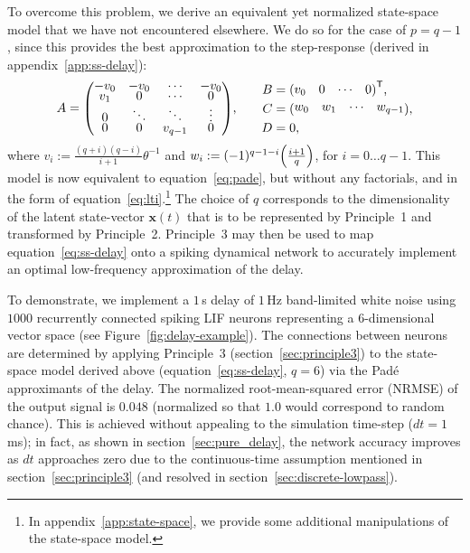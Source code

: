 \documentclass[12pt]{article}
\theoremstyle{definition}
\renewcommand{\vec}{\mathbf}  %
\newcommand{\transpose}[1]{{#1}^\mathsf{T}}
\let\originalleft\left
\let\originalright\right
\renewcommand{\left}{\mathopen{}\mathclose\bgroup\originalleft}
\renewcommand{\right}{\aftergroup\egroup\originalright}
\newenvironment{hpmatrix}{\begingroup\def\arraystretch{0.5}\begin{pmatrix}}{\end{pmatrix}\endgroup\ignorespacesafterend}
\begin{document}
To overcome this problem, we derive an equivalent yet normalized state-space model that we have not encountered elsewhere.
We do so for the case of $p = q - 1$, since this provides the best approximation to the step-response (derived in appendix~\ref{app:ss-delay}):
\begin{equation}
    \begin{alignedat}{2}
        A &= \begin{hpmatrix} -v_0 & -v_0 & \cdots & -v_0 \\ v_1 & 0 & \cdots & 0 \\ 0 & \ddots & \ddots & \vdots \\ 0 & 0 & v_{q-1} & 0\end{hpmatrix} \text{,} & & \quad\quad \begin{alignedat}{1}
            B &= \transpose{\begin{hpmatrix} v_0 & 0 & \cdots & 0\end{hpmatrix}} \text{,} \\
            C &= \begin{hpmatrix} w_0 & w_1 & \cdots & w_{q-1} \end{hpmatrix} \text{,} \\
            D &= 0 \text{,} \label{eq:ss-delay}
        \end{alignedat}
    \end{alignedat}
\end{equation}
where $v_i := \frac{(q+i)(q-i)}{i+1} \theta^{-1}$ and $w_i := (-1)^{q - 1 - i} \left( \frac{i+1}{q} \right)$, for $i = 0 \ldots q-1$.
This model is now equivalent to equation~\ref{eq:pade}, but without any factorials, and in the form of equation~\ref{eq:lti}.\footnote{
In appendix~\ref{app:state-space}, we provide some additional manipulations of the state-space model.}
The choice of $q$ corresponds to the dimensionality of the latent state-vector $\vec{x}(t)$ that is to be represented by Principle~1 and transformed by Principle~2.
Principle~3 may then be used to map equation~\ref{eq:ss-delay} onto a spiking dynamical network to accurately implement an optimal low-frequency approximation of the delay.

To demonstrate, we implement a $1$\,s delay of $1\,$Hz band-limited white noise using $\num{1000}$ recurrently connected spiking LIF neurons representing a $6$-dimensional vector space (see Figure~\ref{fig:delay-example}).
The connections between neurons are determined by applying Principle~3 (section~\ref{sec:principle3}) to the state-space model derived above (equation~\ref{eq:ss-delay}, $q=6$) via the Pad\'e approximants of the delay.
The normalized root-mean-squared error (NRMSE) of the output signal is $0.048$ (normalized so that $1.0$ would correspond to random chance).
This is achieved without appealing to the simulation time-step ($dt = 1$\,ms); in fact, as shown in section~\ref{sec:pure_delay}, the network accuracy improves as $dt$ approaches zero due to the continuous-time assumption mentioned in section~\ref{sec:principle3} (and resolved in section~\ref{sec:discrete-lowpass}).
\end{document}

